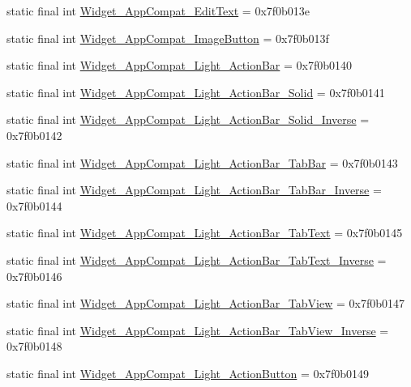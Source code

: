 \begin{CompactItemize}
\item 
static final int \hyperlink{classandroid_1_1support_1_1coreutils_1_1_r_1_1style_491669a9e453aa4dc63035ae3485df72}{Widget\_\-AppCompat\_\-EditText} = 0x7f0b013e
\item 
static final int \hyperlink{classandroid_1_1support_1_1coreutils_1_1_r_1_1style_1679b0f9765dbc0a83696051d4955752}{Widget\_\-AppCompat\_\-ImageButton} = 0x7f0b013f
\item 
static final int \hyperlink{classandroid_1_1support_1_1coreutils_1_1_r_1_1style_83b02cbd7807cab33419c48f1c893d2a}{Widget\_\-AppCompat\_\-Light\_\-ActionBar} = 0x7f0b0140
\item 
static final int \hyperlink{classandroid_1_1support_1_1coreutils_1_1_r_1_1style_410b0d5a9604317c4d1368979efc59ab}{Widget\_\-AppCompat\_\-Light\_\-ActionBar\_\-Solid} = 0x7f0b0141
\item 
static final int \hyperlink{classandroid_1_1support_1_1coreutils_1_1_r_1_1style_68782db24682d736a8227af6ca24f58a}{Widget\_\-AppCompat\_\-Light\_\-ActionBar\_\-Solid\_\-Inverse} = 0x7f0b0142
\item 
static final int \hyperlink{classandroid_1_1support_1_1coreutils_1_1_r_1_1style_0a8b392c4ae81a62c9a55dcdce66460e}{Widget\_\-AppCompat\_\-Light\_\-ActionBar\_\-TabBar} = 0x7f0b0143
\item 
static final int \hyperlink{classandroid_1_1support_1_1coreutils_1_1_r_1_1style_e1e51277ce449e356b6e64e420ae35ec}{Widget\_\-AppCompat\_\-Light\_\-ActionBar\_\-TabBar\_\-Inverse} = 0x7f0b0144
\item 
static final int \hyperlink{classandroid_1_1support_1_1coreutils_1_1_r_1_1style_c3fe8351d394e7ed7d25624077554e5a}{Widget\_\-AppCompat\_\-Light\_\-ActionBar\_\-TabText} = 0x7f0b0145
\item 
static final int \hyperlink{classandroid_1_1support_1_1coreutils_1_1_r_1_1style_74dce552568074c4de5da885826aab24}{Widget\_\-AppCompat\_\-Light\_\-ActionBar\_\-TabText\_\-Inverse} = 0x7f0b0146
\item 
static final int \hyperlink{classandroid_1_1support_1_1coreutils_1_1_r_1_1style_b57436afa115c37269fda992032810ab}{Widget\_\-AppCompat\_\-Light\_\-ActionBar\_\-TabView} = 0x7f0b0147
\item 
static final int \hyperlink{classandroid_1_1support_1_1coreutils_1_1_r_1_1style_293d1fcfe7364c6b3e6793ca701e25fb}{Widget\_\-AppCompat\_\-Light\_\-ActionBar\_\-TabView\_\-Inverse} = 0x7f0b0148
\item 
static final int \hyperlink{classandroid_1_1support_1_1coreutils_1_1_r_1_1style_394348aa6cf992b4672387492e22602a}{Widget\_\-AppCompat\_\-Light\_\-ActionButton} = 0x7f0b0149

\end{CompactItemize}
